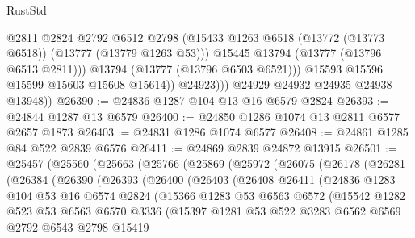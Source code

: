 \begin{lexlean}{RustStd}
\begin{coremodule}
                      @2811
                      @2824
                      @2792
                      @6512
                      @2798
                      (@15433 @1263 @6518 (@13772 (@13773 @6518)) (@13777 (@13779 @1263 @53)))
                      @15445
                      @13794
                      (@13777 (@13796 @6513 @2811)))
                    @13794
                    (@13777 (@13796 @6503 @6521)))
                  @15593
                  @15596
                  @15599
                  @15603
                  @15608
                  @15614))
              @24923)))
        @24929
        @24932
        @24935
        @24938
        @13948))
@26390 := @24836 @1287 @104 @13 @16 @6579 @2824
@26393 := @24844 @1287 @13 @6579
@26400 := @24850 @1286 @1074 @13 @2811 @6577 @2657 @1873
@26403 := @24831 @1286 @1074 @6577
@26408 := @24861 @1285 @84 @522 @2839 @6576
@26411 := @24869 @2839 @24872 @13915
@26501 := @25457
    (@25560
      (@25663
        (@25766
          (@25869
            (@25972
              (@26075
                (@26178
                  (@26281
                    (@26384
                      (@26390
                        (@26393
                          (@26400
                            (@26403
                              (@26408
                                @26411
                                (@24836
                                  @1283
                                  @104
                                  @53
                                  @16
                                  @6574
                                  @2824
                                  (@15366
                                    @1283
                                    @53
                                    @6563
                                    @6572
                                    (@15542
                                      @1282
                                      @523
                                      @53
                                      @6563
                                      @6570
                                      @3336
                                      (@15397
                                        @1281
                                        @53
                                        @522
                                        @3283
                                        @6562
                                        @6569
                                        @2792
                                        @6543
                                        @2798
                                        @15419

\end{coremodule}
\end{lexlean}
